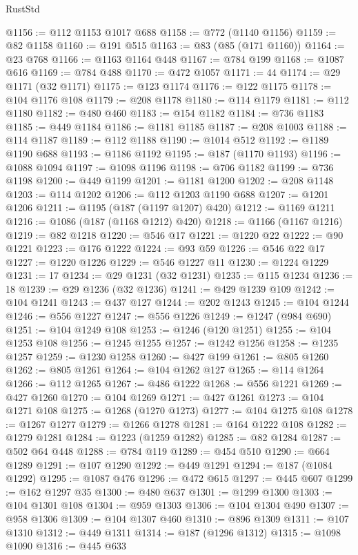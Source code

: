 \begin{lexlean}{RustStd}
\begin{coremodule}
@1156 := @112 @1153 @1017 @688
@1158 := @772 (@1140 @1156)
@1159 := @82 @1158
@1160 := @191 @515
@1163 := @83 (@85 (@171 @1160))
@1164 := @23 @768
@1166 := @1163 @1164 @448
@1167 := @784 @199
@1168 := @1087 @616
@1169 := @784 @488
@1170 := @472 @1057
@1171 := 44
@1174 := @29 @1171 (@32 @1171)
@1175 := @123 @1174
@1176 := @122 @1175
@1178 := @104 @1176 @108
@1179 := @208 @1178
@1180 := @114 @1179
@1181 := @112 @1180
@1182 := @480 @460
@1183 := @154 @1182
@1184 := @736 @1183
@1185 := @449 @1184
@1186 := @1181 @1185
@1187 := @208 @1003
@1188 := @114 @1187
@1189 := @112 @1188
@1190 := @1014 @512
@1192 := @1189 @1190 @688
@1193 := @1186 @1192
@1195 := @187 (@1170 @1193)
@1196 := @1088 @1094
@1197 := @1098 @1196
@1198 := @706 @1182
@1199 := @736 @1198
@1200 := @449 @1199
@1201 := @1181 @1200
@1202 := @208 @1148
@1203 := @114 @1202
@1206 := @112 @1203 @1190 @688
@1207 := @1201 @1206
@1211 := @1195 (@187 (@1197 @1207) @420)
@1212 := @1169 @1211
@1216 := @1086 (@187 (@1168 @1212) @420)
@1218 := @1166 (@1167 @1216)
@1219 := @82 @1218
@1220 := @546 @17
@1221 := @1220 @22
@1222 := @90 @1221
@1223 := @176 @1222
@1224 := @93 @59
@1226 := @546 @22 @17
@1227 := @1220 @1226
@1229 := @546 @1227 @11
@1230 := @1224 @1229
@1231 := 17
@1234 := @29 @1231 (@32 @1231)
@1235 := @115 @1234
@1236 := 18
@1239 := @29 @1236 (@32 @1236)
@1241 := @429 @1239 @109
@1242 := @104 @1241
@1243 := @437 @127
@1244 := @202 @1243
@1245 := @104 @1244
@1246 := @556 @1227
@1247 := @556 @1226
@1249 := @1247 (@984 @690)
@1251 := @104 @1249 @108
@1253 := @1246 (@120 @1251)
@1255 := @104 @1253 @108
@1256 := @1245 @1255
@1257 := @1242 @1256
@1258 := @1235 @1257
@1259 := @1230 @1258
@1260 := @427 @199
@1261 := @805 @1260
@1262 := @805 @1261
@1264 := @104 @1262 @127
@1265 := @114 @1264
@1266 := @112 @1265
@1267 := @486 @1222
@1268 := @556 @1221
@1269 := @427 @1260
@1270 := @104 @1269
@1271 := @427 @1261
@1273 := @104 @1271 @108
@1275 := @1268 (@1270 @1273)
@1277 := @104 @1275 @108
@1278 := @1267 @1277
@1279 := @1266 @1278
@1281 := @164 @1222 @108
@1282 := @1279 @1281
@1284 := @1223 (@1259 @1282)
@1285 := @82 @1284
@1287 := @502 @64 @448
@1288 := @784 @119
@1289 := @454 @510
@1290 := @664 @1289
@1291 := @107 @1290
@1292 := @449 @1291
@1294 := @187 (@1084 @1292)
@1295 := @1087 @476
@1296 := @472 @615
@1297 := @445 @607
@1299 := @162 @1297 @35
@1300 := @480 @637
@1301 := @1299 @1300
@1303 := @104 @1301 @108
@1304 := @959 @1303
@1306 := @104 @1304 @490
@1307 := @958 @1306
@1309 := @104 @1307 @460
@1310 := @896 @1309
@1311 := @107 @1310
@1312 := @449 @1311
@1314 := @187 (@1296 @1312)
@1315 := @1098 @1090
@1316 := @445 @633

\end{coremodule}
\end{lexlean}

